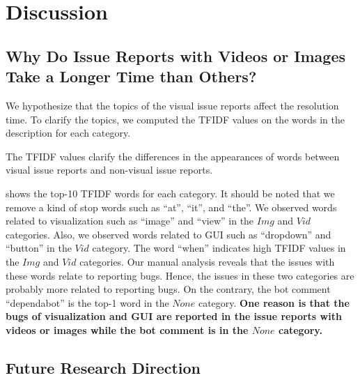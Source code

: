 \section{Discussion}
%

\subsection{Why Do Issue Reports with Videos or Images Take a Longer Time than Others?}


We hypothesize that the topics of the visual issue reports 
affect the resolution time. 
To clarify the topics, we computed the TFIDF values 
on the words in the description for each category. 

The TFIDF values clarify the differences in the appearances of 
words between visual issue reports and 
non-visual issue reports. 

 shows the top-10 TFIDF words
for each category.
It should be noted that we remove a kind of stop words such as 
``at'', ``it'', and ``the''. 
We observed words related to visualization such as 
``image'' and ``view'' in the $Img$ and $Vid$ categories. 
Also, we observed words related to GUI such as 
``dropdown'' and ``button'' in the $Vid$ category. 
The word ``when'' indicates high TFIDF values 
in the $Img$ and $Vid$ categories. 
Our manual analysis reveals that the issues with 
these words relate to reporting bugs. 
Hence, the issues in these two categories are 
probably more related to reporting bugs. 
On the contrary, the bot comment ``dependabot'' is 
the top-1 word in the $None$ category. 
\summarybox
{\bf  
One reason is that the bugs of visualization and GUI are 
reported in the issue reports with videos or images 
while the bot comment is in the $None$ category.  
}


\subsection{Future Research Direction}
\\

